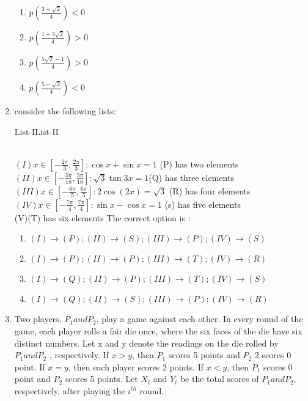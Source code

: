 \documentclass{article}
\begin{document}
\begin{enumerate}
\begin{enumerate}[label=\Alph*.]
\item $p(\frac{3+\sqrt{2}}{4}) < 0$
\item $p(\frac{1+3\sqrt{2}}{4}) > 0$
\item $p(\frac{5\sqrt{2}-1}{4}) > 0$
\item $p(\frac{5-\sqrt{2}}{4}) < 0$
	\end{enumerate}
	\item consider the following lists:\\
		\centerline{List-I\qquad\qquad\qquad \qquad\qquad\qquad List-II}\\
	$(I){ x \in [ -\frac{2\pi}{3}, \frac{2\pi}{3} ] : \cos x + \sin x = 1 }$ \qquad(P) has two elements\\
	$(II){ x \in [ -\frac{5\pi}{18}, \frac{5\pi}{18} ] : \sqrt{3} \tan 3x = 1 }$\quad \qquad(Q) has three elements \\
        $(III){ x \in [ -\frac{6\pi}{5}, \frac{6\pi}{5} ] : 2 \cos (2x) = \sqrt{3} }$ \qquad(R) has four elements \\
	$(IV){ x \in [ -\frac{7\pi}{4}, \frac{7\pi}{4} ] : \sin x - \cos x = 1 }$ \qquad(s) has five elements\\
	 (V)\qquad\qquad\qquad\qquad\qquad\qquad\qquad\qquad\quad (T) has six elements
	 \mydet
  The correct option is :\\
  \begin{enumerate}[label=\Alph*.]
		  
	  \item  $(I)\to(P);(II)\to(S);(III)\to(P);(IV)\to(S)$
	  \item  $(I)\to(P);(II)\to(P);(III)\to(T);(IV)\to(R)$
	  \item  $(I)\to(Q);(II)\to(P);(III)\to(T);(IV)\to(S)$
	  \item  $(I)\to(Q);(II)\to(S);(III)\to(P);(IV)\to(R)$
\end{enumerate}

	\item Two players, $P_1 and P_2$, play a game against each other. In every round of the game, each player rolls a fair die once, where the six faces of the die have six distinct numbers. Let x and y denote the readings on the die rolled by $P_1 and P_2$ , respectively. If $x > y$, then $P_1$ scores 5 points and $P_2$ 2 scores 0 point. If $x = y$, then each player scores 2 points. If $x < y$, then $P_1$ scores 0 point and $P_2$ scores 5 points. Let $X_i$ and $Y_i$ be the total scores of $P_1 and P_2$, respectively, after playing the $i^{th}$ round.


\end{enumerate}
\end{document}
